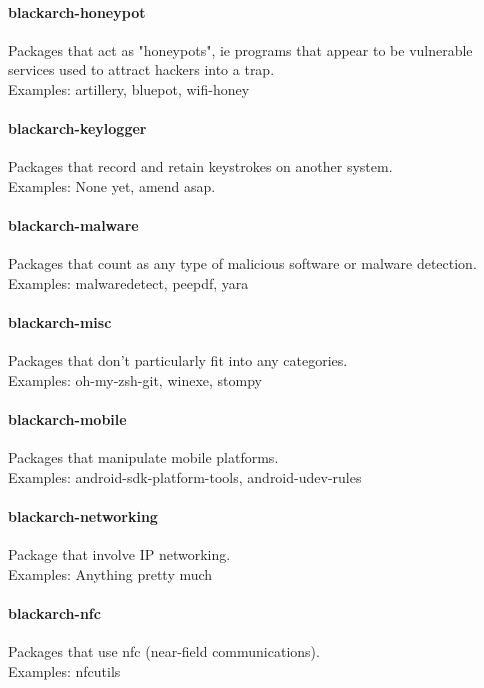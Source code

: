 \documentclass[a4paper, oneside,12pt]{scrartcl}
\begin{document}
\paragraph{blackarch-honeypot}
Packages that act as "honeypots", ie programs that appear to
be vulnerable services used to attract hackers into a trap.
\\
Examples: artillery, bluepot, wifi-honey

\paragraph{blackarch-keylogger}
Packages that record and retain keystrokes on another system.
\\
Examples: None yet, amend asap.

\paragraph{blackarch-malware}
Packages that count as any type of malicious software or
malware detection.
\\
Examples: malwaredetect, peepdf, yara

\paragraph{blackarch-misc}
Packages that don't particularly fit into any categories.
\\
Examples: oh-my-zsh-git, winexe, stompy

\paragraph{blackarch-mobile}
Packages that manipulate mobile platforms.
\\
Examples: android-sdk-platform-tools, android-udev-rules

\paragraph{blackarch-networking}
Package that involve IP networking.
\\
Examples: Anything pretty much

\paragraph{blackarch-nfc}
Packages that use nfc (near-field communications).
\\
Examples: nfcutils
\end{document}
